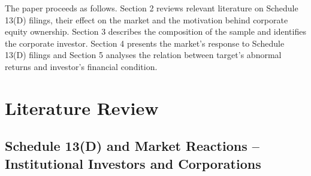 \documentclass[12pt]{article}
\begin{document}
The paper proceeds as follows. Section 2 reviews relevant literature on Schedule 13(D) filings, their effect on the market and the motivation behind corporate equity ownership. Section 3 describes the composition of the sample and identifies the corporate investor. Section 4 presents the market's response to Schedule 13(D) filings and Section 5 analyses the relation between target's abnormal returns and investor's financial condition.

\section{Literature Review}

\subsection{Schedule 13(D) and Market Reactions -- Institutional Investors and Corporations}
\end{document}
